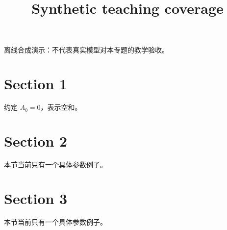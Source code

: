 \documentclass[UTF8,fontset=fandol,11pt]{ctexart}
\title{Synthetic teaching coverage}
\date{}
\begin{document}
\maketitle
\par\noindent 离线合成演示：不代表真实模型对本专题的教学验收。\par
\section{Section 1}\label{sec:S01}
约定 $A_0=0$，表示空和。\par
\section{Section 2}\label{sec:S02}
本节当前只有一个具体参数例子。\par
\section{Section 3}\label{sec:S03}
本节当前只有一个具体参数例子。\par
\end{document}
